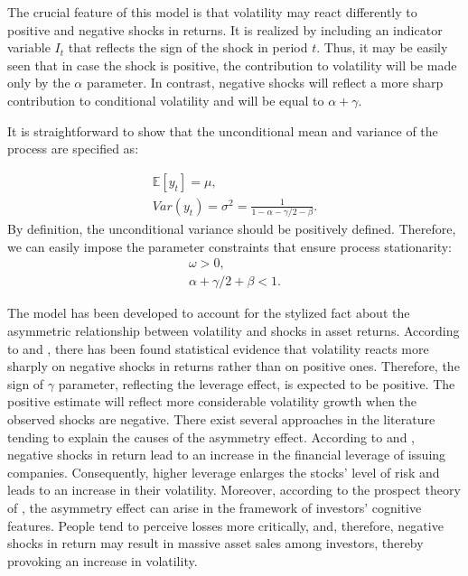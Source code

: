 \documentclass[authoryear, 1p]{elsarticle}
\numberwithin{equation}{section}
\begin{document}
The crucial feature of this model is that volatility may react differently to positive and negative shocks in returns. It is realized by including an indicator variable $I_{t}$ that reflects the sign of the shock in period $t$. Thus, it may be easily seen that in case the shock is positive, the contribution to volatility will be made only by the $\alpha$ parameter. In contrast, negative shocks will reflect a more sharp contribution to conditional volatility and will be equal to $\alpha + \gamma$.

It is straightforward to show that the unconditional mean and variance of the process are specified as:

\begin{equation}
\begin{gathered}
\mathbb{E} [y_{t}] = \mu, \\
Var \left(y_{t} \right) = \sigma^2 = \frac{1}{1 - \alpha - \gamma / 2 - \beta}.
\end{gathered}
\end{equation}
By definition, the unconditional variance should be positively defined. Therefore, we can easily impose the parameter constraints that ensure process stationarity:
\begin{equation}
\begin{gathered}
\omega > 0, \\
\alpha + \gamma/2 + \beta < 1.
\end{gathered}
\end{equation}

The model has been developed to account for the stylized fact about the asymmetric relationship between volatility and shocks in asset returns. According to \citep{Zhang2006} and \citep{Black1976}, there has been found statistical evidence that volatility reacts more sharply on negative shocks in returns rather than on positive ones. Therefore, the sign of $\gamma$ parameter, reflecting the leverage effect, is expected to be positive. The positive estimate will reflect more considerable volatility growth when the observed shocks are negative. There exist several approaches in the literature tending to explain the causes of the asymmetry effect. According to \citep{Black1976} and \citep{Christie1982}, negative shocks in return lead to an increase in the financial leverage of issuing companies. Consequently, higher leverage enlarges the stocks' level of risk and leads to an increase in their volatility. Moreover, according to the prospect theory of \citep{Kahneman1979}, the asymmetry effect can arise in the framework of investors' cognitive features. People tend to perceive losses more critically, and, therefore, negative shocks in return may result in massive asset sales among investors, thereby provoking an increase in volatility. 
\end{document}
